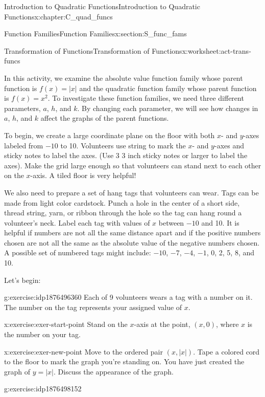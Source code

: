 \documentclass[oneside,10pt,]{book}
\numberwithin{equation}{chapter}
\begin{document}
\begin{chapterptx}{Introduction to Quadratic Functions}{}{Introduction to Quadratic Functions}{}{}{x:chapter:C_quad_funcs}
\begin{sectionptx}{Function Families}{}{Function Families}{}{}{x:section:S_func_fams}
\begin{worksheet-subsection}{Transformation of Functions}{}{Transformation of Functions}{}{}{x:worksheet:act-trans-funcs}
\begin{introduction}{}%
In this activity, we examine the absolute value function family whose parent function is \(f(x) = |x|\) and the quadratic function family whose parent function is \(f(x) = x^2\). To investigate these function families, we need three different parameters, \(a\), \(h\), and \(k\). By changing each parameter, we will see how changes in \(a\), \(h\), and \(k\) affect the graphs of the parent functions.%
\par
To begin, we create a large coordinate plane on the floor with both \(x\)- and \(y\)-axes labeled from \(-10\) to 10. Volunteers use string to mark the \(x\)- and \(y\)-axes and sticky notes to label the axes. (Use 3 \texttimes{} 3 inch sticky notes or larger to label the axes). Make the grid large enough so that volunteers can stand next to each other on the \(x\)-axis. A tiled floor is very helpful!%
\par
We also need to prepare a set of hang tags that volunteers can wear. Tags can be made from light color cardstock. Punch a hole in the center of a short side, thread string, yarn, or ribbon through the hole so the tag can hang round a volunteer's neck. Label each tag with values of \(x\) between \(-10\) and 10. It is helpful if numbers are not all the same distance apart and if the positive numbers chosen are not all the same as the absolute value of the negative numbers chosen. A possible set of numbered tags might include: \(-10\), \(-7\), \(-4\), \(-1\), 0, 2, 5, 8, and 10.%
\par
Let's begin:%
\end{introduction}%
\begin{divisionexercise}{1}{}{}{g:exercise:idp1876496360}%
Each of 9 volunteers wears a tag with a number on it. The number on the tag represents your assigned value of \(x\).%
\end{divisionexercise}%
\begin{divisionexercise}{2}{}{}{x:exercise:exer-start-point}%
Stand on the \(x\)-axis at the point, \((x, 0)\), where \(x\) is the number on your tag.%
\end{divisionexercise}%
\begin{divisionexercise}{3}{}{}{x:exercise:exer-new-point}%
Move to the ordered pair \((x, |x|)\). Tape a colored cord to the floor to mark the graph you're standing on. You have just created the graph of \(y = |x|\). Discuss the appearance of the graph.%
\end{divisionexercise}%
\begin{divisionexercise}{4}{}{}{g:exercise:idp1876498152}%

\end{divisionexercise}
\end{worksheet-subsection}
\end{sectionptx}
\end{chapterptx}
\end{document}

